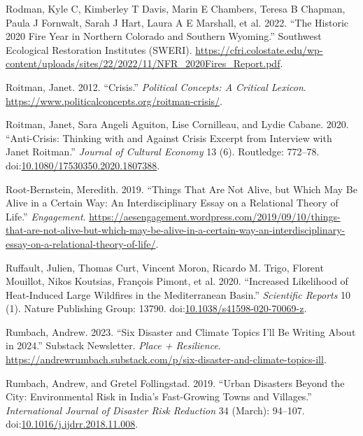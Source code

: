 \documentclass[
]{article}
\newlength{\cslhangindent}
\newenvironment{CSLReferences}[2] %
 {\begin{list}{}{%
  \setlength{\itemindent}{0pt}
  \setlength{\leftmargin}{0pt}
  \setlength{\parsep}{0pt}
  \ifodd #1
   \setlength{\leftmargin}{\cslhangindent}
   \setlength{\itemindent}{-1\cslhangindent}
  \fi
  \setlength{\itemsep}{#2\baselineskip}}}
 {\end{list}}
\begin{document}
\begin{CSLReferences}{1}{0}
Rodman, Kyle C, Kimberley T Davis, Marin E Chambers, Teresa B Chapman, Paula J Fornwalt, Sarah J Hart, Laura A E Marshall, et al. 2022. {``The Historic 2020 Fire Year in Northern {Colorado} and Southern {Wyoming}.''} Southwest Ecological Restoration Institutes (SWERI). \url{https://cfri.colostate.edu/wp-content/uploads/sites/22/2022/11/NFR_2020Fires_Report.pdf}.

Roitman, Janet. 2012. {``Crisis.''} \emph{Political Concepts: A Critical Lexicon}. \url{https://www.politicalconcepts.org/roitman-crisis/}.

Roitman, Janet, Sara Angeli Aguiton, Lise Cornilleau, and Lydie Cabane. 2020. {``Anti-{Crisis}: Thinking with and Against Crisis Excerpt from Interview with {Janet Roitman}.''} \emph{Journal of Cultural Economy} 13 (6). Routledge: 772--78. doi:\href{https://doi.org/10.1080/17530350.2020.1807388}{10.1080/17530350.2020.1807388}.

Root-Bernstein, Meredith. 2019. {``Things {That Are Not Alive}, but {Which May Be Alive} in a {Certain Way}: {An Interdisciplinary Essay} on a {Relational Theory} of {Life}.''} \emph{Engagement}. \url{https://aesengagement.wordpress.com/2019/09/10/things-that-are-not-alive-but-which-may-be-alive-in-a-certain-way-an-interdisciplinary-essay-on-a-relational-theory-of-life/}.

Ruffault, Julien, Thomas Curt, Vincent Moron, Ricardo M. Trigo, Florent Mouillot, Nikos Koutsias, François Pimont, et al. 2020. {``Increased Likelihood of Heat-Induced Large Wildfires in the {Mediterranean Basin}.''} \emph{Scientific Reports} 10 (1). Nature Publishing Group: 13790. doi:\href{https://doi.org/10.1038/s41598-020-70069-z}{10.1038/s41598-020-70069-z}.

Rumbach, Andrew. 2023. {``Six {Disaster} and {Climate Topics I}'ll Be {Writing About} in 2024.''} Substack Newsletter. \emph{Place + Resilience}. \url{https://andrewrumbach.substack.com/p/six-disaster-and-climate-topics-ill}.

Rumbach, Andrew, and Gretel Follingstad. 2019. {``Urban Disasters Beyond the City: {Environmental} Risk in {India}'s Fast-Growing Towns and Villages.''} \emph{International Journal of Disaster Risk Reduction} 34 (March): 94--107. doi:\href{https://doi.org/10.1016/j.ijdrr.2018.11.008}{10.1016/j.ijdrr.2018.11.008}.


\end{CSLReferences}
\end{document}
